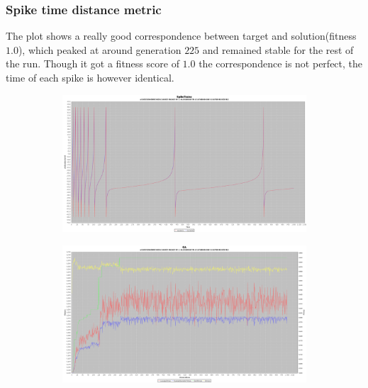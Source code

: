 \documentclass[10pt]{article}
\begin{document}
		\subsubsection{Spike time distance metric}
			The plot shows a really good correspondence between target and solution(fitness $1.0$), which peaked at around generation $225$ and remained stable for the rest of the run. Though it got a fitness score of $1.0$ the correspondence is not perfect, the time of each spike is however identical.
			\begin{figure}[H]
				\centering
					\begin{subfigure}{.5\textwidth}
						\centering
						\includegraphics[width=\linewidth]{./../images/izzy4/time/plot.png}
						
						\label{fig:sub10a}
					\end{subfigure}%
					\begin{subfigure}{.5\textwidth}
						\centering
						\includegraphics[width=\linewidth]{./../images/izzy4/time/prog.png}
						
						\label{fig:sub10b}
					\end{subfigure}
					
					\label{fig:plot10}
			\end{figure}
			
\end{document}
